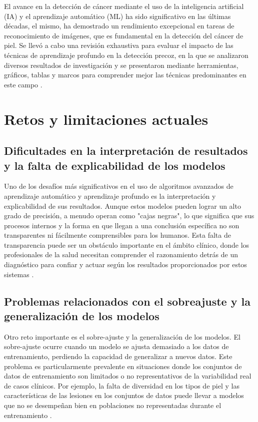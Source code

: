 El avance en la detección de cáncer mediante el uso de la inteligencia artificial (IA) y el aprendizaje automático (ML) ha sido significativo en 
las últimas décadas, el mismo, ha demostrado un rendimiento excepcional en tareas de reconocimiento de imágenes, que es fundamental en la detección 
del cáncer de piel. Se llevó a cabo una revisión exhaustiva para evaluar el impacto de las técnicas de aprendizaje profundo en la detección precoz, 
en la que se analizaron diversos resultados de investigación y se presentaron mediante herramientas, gráficos, tablas y marcos para comprender mejor 
las técnicas predominantes en este campo .


\section{Retos y limitaciones actuales}

\subsection*{Dificultades en la interpretación de resultados y la falta de explicabilidad de los modelos}

Uno de los desafíos más significativos en el uso de algoritmos avanzados de aprendizaje automático y aprendizaje profundo es la interpretación y explicabilidad de sus resultados. Aunque estos modelos pueden lograr un alto grado de precisión, a menudo operan como "cajas negras", lo que significa que sus procesos internos y la forma en que llegan a una conclusión específica no son transparentes ni fácilmente comprensibles para los humanos. Esta falta de transparencia puede ser un obstáculo importante en el ámbito clínico, donde los profesionales de la salud necesitan comprender el razonamiento detrás de un diagnóstico para confiar y actuar según los resultados proporcionados por estos sistemas .


\subsection*{Problemas relacionados con el sobreajuste y la generalización de los modelos}
Otro reto importante es el sobre-ajuste y la generalización de los modelos. El sobre-ajuste ocurre cuando un modelo se ajusta demasiado a los datos de entrenamiento, perdiendo la capacidad de generalizar a nuevos datos. Este problema es particularmente prevalente en situaciones donde los conjuntos de datos de entrenamiento son limitados o no representativos de la variabilidad real de casos clínicos. Por ejemplo, la falta de diversidad en los tipos de piel y las características de las lesiones en los conjuntos de datos puede llevar a modelos que no se desempeñan bien en poblaciones no representadas durante el entrenamiento .

